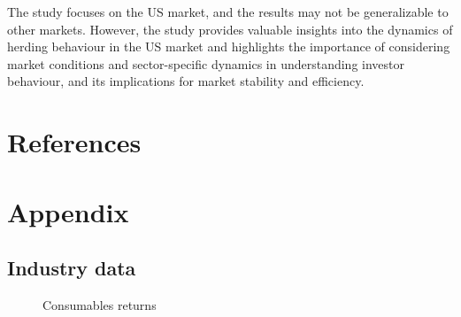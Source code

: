 \documentclass[
  letterpaper,
  DIV=11,
  numbers=noendperiod]{scrartcl}
\begin{document}
The study focuses on the US market, and the results may not be
generalizable to other markets. However, the study provides valuable
insights into the dynamics of herding behaviour in the US market and
highlights the importance of considering market conditions and
sector-specific dynamics in understanding investor behaviour, and its
implications for market stability and efficiency.

\newpage

\section*{References}\label{references}

\renewcommand{\bibsection}{}


\setcounter{section}{0}
\renewcommand{\thesection}{\Alph{section}}

\setcounter{table}{0}
\renewcommand{\thetable}{A\arabic{table}}

\setcounter{figure}{0}
\renewcommand{\thefigure}{A\arabic{figure}}

\newpage

\section{Appendix}\label{appendix}

\subsection{Industry data}\label{industry-data}

\begin{figure}[H]


\caption{\label{fig-cons}Consumables returns}

\end{figure}%
\end{document}
